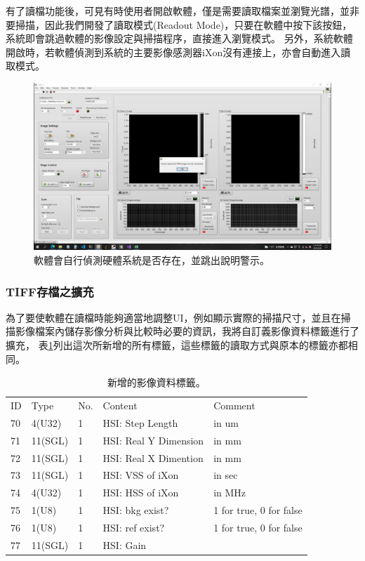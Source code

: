 \documentclass[12pt]{article}
\begin{document}
有了讀檔功能後，可見有時使用者開啟軟體，僅是需要讀取檔案並瀏覽光譜，並非要掃描，因此我們開發了讀取模式(Readout Mode)，只要在軟體中按下該按鈕，系統即會跳過軟體的影像設定與掃描程序，直接進入瀏覽模式。
另外，系統軟體開啟時，若軟體偵測到系統的主要影像感測器iXon沒有連接上，亦會自動進入讀取模式。
\begin{figure}[ht]
    \centering
    \includegraphics[width=\linewidth]{detectHW.jpeg}
    \caption{軟體會自行偵測硬體系統是否存在，並跳出說明警示。}
    \label{figure: detect hardware}
\end{figure}
\subsubsection{TIFF存檔之擴充}
為了要使軟體在讀檔時能夠適當地調整UI，例如顯示實際的掃描尺寸，並且在掃描影像檔案內儲存影像分析與比較時必要的資訊，我將自訂義影像資料標籤進行了擴充，
表\ref{tab: new tag}列出這次所新增的所有標籤，這些標籤的讀取方式與原本的標籤亦都相同。

\begin{table}[ht]
    \begin{tabular}{lllll}
        ID & Type    & No. & Content               & Comment             \\
        70 & 4(U32)  & 1   & HSI: Step Length      & in um                   \\
        71 & 11(SGL) & 1   & HSI: Real Y Dimension & in mm                   \\
        72 & 11(SGL) & 1   & HSI: Real X Dimention & in mm                   \\
        73 & 11(SGL) & 1   & HSI: VSS of iXon      & in sec                  \\
        74 & 4(U32)  & 1   & HSI: HSS of iXon      & in MHz                  \\
        75 & 1(U8)   & 1   & HSI: bkg exist?       & 1 for true, 0 for false \\
        76 & 1(U8)   & 1   & HSI: ref exist?       & 1 for true, 0 for false \\
        77 & 11(SGL) & 1   & HSI: Gain             &
    \end{tabular}
    \caption{新增的影像資料標籤。}
    \label{tab: new tag}
\end{table}
\end{document}
